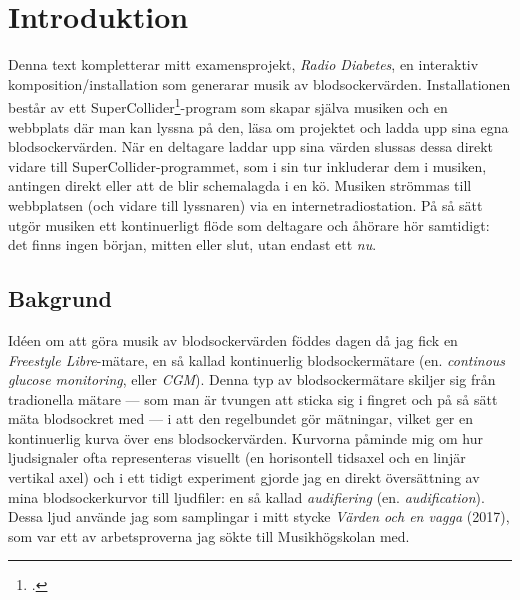 \documentclass[11pt, a4paper]{article} %
\begin{document}
\tableofcontents
\clearpage


\newpage

\section*{Introduktion}
Denna text kompletterar mitt examensprojekt, \emph{Radio Diabetes}, en interaktiv komposition/installation som generarar musik av blodsockervärden. Installationen består av ett SuperCollider\footcite{noauthor_supercollider_nodate}-program som skapar själva musiken och en webbplats där man kan lyssna på den, läsa om projektet och ladda upp sina egna blodsockervärden. När en deltagare laddar upp sina värden slussas dessa direkt vidare till SuperCollider-programmet, som i sin tur inkluderar dem i musiken, antingen direkt eller att de blir schemalagda i en kö. Musiken strömmas till webbplatsen (och vidare till lyssnaren) via en internetradiostation. På så sätt utgör musiken ett kontinuerligt flöde som deltagare och åhörare hör samtidigt: det finns ingen början, mitten eller slut, utan endast ett \emph{nu}. %



\subsection*{Bakgrund}
Idéen om att göra musik av blodsockervärden föddes dagen då jag fick en \emph{Freestyle Libre}-mätare, en så kallad kontinuerlig blodsockermätare (en. \emph{continous glucose monitoring}, eller \emph{CGM}). Denna typ av blodsockermätare skiljer sig från tradionella mätare --- som man är tvungen att sticka sig i fingret och på så sätt mäta blodsockret med --- i att den regelbundet gör mätningar, vilket ger en kontinuerlig kurva över ens blodsockervärden. Kurvorna påminde mig om hur ljudsignaler ofta representeras visuellt (en horisontell tidsaxel och en linjär vertikal axel) och i ett tidigt experiment gjorde jag en direkt översättning av mina blodsockerkurvor till ljudfiler: en så kallad \emph{audifiering} (en. \emph{audification}). Dessa ljud använde jag som samplingar i mitt stycke \emph{Värden och en vagga} (2017), som var ett av arbetsproverna jag sökte till Musikhögskolan med. 
\end{document}
